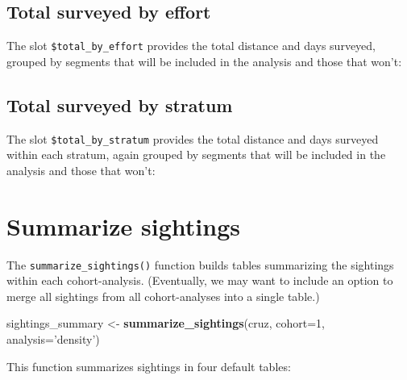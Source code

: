 \documentclass[
]{book}
\newenvironment{Shaded}{\begin{snugshade}}{\end{snugshade}}
\newcommand{\DataTypeTok}[1]{\textcolor[rgb]{0.13,0.29,0.53}{#1}}
\newcommand{\DecValTok}[1]{\textcolor[rgb]{0.00,0.00,0.81}{#1}}
\newcommand{\KeywordTok}[1]{\textcolor[rgb]{0.13,0.29,0.53}{\textbf{#1}}}
\newcommand{\NormalTok}[1]{#1}
\newcommand{\OperatorTok}[1]{\textcolor[rgb]{0.81,0.36,0.00}{\textbf{#1}}}
\newcommand{\StringTok}[1]{\textcolor[rgb]{0.31,0.60,0.02}{#1}}
\begin{document}
\hypertarget{total-surveyed-by-effort}{%
\subsection*{Total surveyed by effort}\label{total-surveyed-by-effort}}

The slot \texttt{\$total\_by\_effort} provides the total distance and days surveyed, grouped by segments that will be included in the analysis and those that won't:

\hypertarget{total-surveyed-by-stratum}{%
\subsection*{Total surveyed by stratum}\label{total-surveyed-by-stratum}}

The slot \texttt{\$total\_by\_stratum} provides the total distance and days surveyed within each stratum, again grouped by segments that will be included in the analysis and those that won't:

\hypertarget{summarize-sightings}{%
\section*{Summarize sightings}\label{summarize-sightings}}

The \texttt{summarize\_sightings()} function builds tables summarizing the sightings within each cohort-analysis. (Eventually, we may want to include an option to merge all sightings from all cohort-analyses into a single table.)

\begin{Shaded}
\begin{Highlighting}[]
\NormalTok{sightings_summary <-}\StringTok{ }\KeywordTok{summarize_sightings}\NormalTok{(cruz,}
                                         \DataTypeTok{cohort=}\DecValTok{1}\NormalTok{,}
                                         \DataTypeTok{analysis=}\StringTok{'density'}\NormalTok{)}
\end{Highlighting}
\end{Shaded}

This function summarizes sightings in four default tables:

\begin{Shaded}
\end{Shaded}
\end{document}
